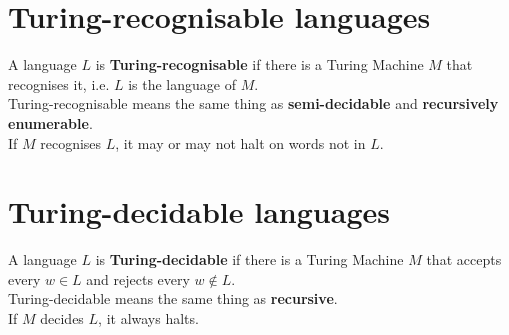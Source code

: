 \documentclass{article}
\begin{document}
\section{Turing-recognisable languages}
A language $L$ is \textbf{Turing-recognisable} if there is a Turing Machine $M$ that recognises it, i.e. $L$ is the language of $M$.
\\Turing-recognisable means the same thing as \textbf{semi-decidable} and \textbf{recursively enumerable}.\medskip
\\ If $M$ recognises $L$, it may or may not halt on words not in $L$.

\section{Turing-decidable languages}
A language $L$ is \textbf{Turing-decidable} if there is a Turing Machine $M$ that accepts every $w \in L$ and rejects every $w \notin L$.
\\ Turing-decidable means the same thing as \textbf{recursive}.\medskip
\\If $M$ decides $L$, it always halts.
\end{document}
